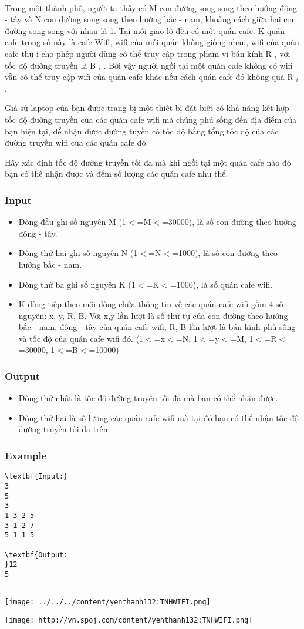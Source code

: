 

 

Trong một thành phố, người ta thấy có M con đường song song theo hướng đông - tây và N con đường song song theo hướng bắc - nam, khoảng cách giữa hai con đường song song với nhau là 1. Tại mỗi giao lộ đều có một quán cafe. K quán cafe trong số này là cafe Wifi, wifi của mỗi quán không giống nhau, wifi của quán cafe thứ i cho phép người dùng có thể truy cập trong phạm vi bán kính R $_ i $ với tốc độ đường truyền là B $_ i $ . Bởi vậy người ngồi tại một quán cafe không có wifi vẫn có thể truy cập wifi của quán cafe khác nếu cách quán cafe đó không quá R $_ i $ .

Giả sử laptop của bạn được trang bị một thiết bị đặt biệt có khả năng kết hợp tốc độ đường truyền của các quán cafe wifi mà chúng phủ sống đến địa điểm của bạn hiện tại, để nhận được đường tuyền có tốc độ bằng tổng tốc độ của các đường truyền wifi của các quán cafe đó.

Hãy xác định tốc độ đường truyền tối đa mà khi ngồi tại một quán cafe nào đó bạn có thể nhận được và đếm số lượng các quán cafe như thế.

\subsubsection{Input}
\begin{itemize}
	\item Dòng đầu ghi số nguyên M (1$<$=M$<$=30000), là số con đường theo hướng đông - tây.
	\item Dòng thứ hai ghi số nguyên N (1$<$=N$<$=1000), là số con đường theo hướng bắc - nam.
	\item Dòng thứ ba ghi số nguyên K (1$<$=K$<$=1000), là số quán cafe wifi.
	\item K dòng tiếp theo mỗi dòng chứa thông tin về các quán cafe wifi gồm 4 số nguyên: x, y, R, B. Với x,y lần lượt là số thứ tự của con đường theo hướng bắc - nam, đông - tây của quán cafe wifi, R, B lần lượt là bán kính phủ sống và tốc độ của quán cafe wifi đó. (1$<$=x$<$=N, 1$<$=y$<$=M, 1$<$=R$<$=30000, 1$<$=B$<$=10000)
\end{itemize}

\subsubsection{Output}
\begin{itemize}
	\item Dòng thứ nhất là tốc độ đường truyền tối đa mà bạn có thể nhận được.
	\item Dòng thứ hai là số lượng các quán cafe wifi mà tại đó bạn có thể nhận tốc độ đường truyền tối đa trên.
\end{itemize}

\subsubsection{Example}
\begin{verbatim}
\textbf{Input:}
3
5
3
1 3 2 5
3 1 2 7
5 1 1 5

\textbf{Output:
}12
5


\end{verbatim}


\texttt{[image: ../../../content/yenthanh132:TNHWIFI.png]}


\texttt{[image: http://vn.spoj.com/content/yenthanh132:TNHWIFI.png]}